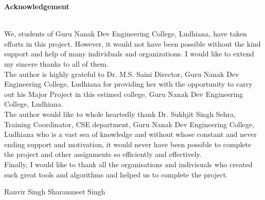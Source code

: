 \begin{center}
{\Huge \noindent \bf{Acknowledgement}\vskip 0.2in}
\end{center}
 \hrulefill \\

We, students of Guru Nanak Dev Engineering College, Ludhiana, have taken efforts in this project.
However, it would not have been possible without the kind support and help of many individuals
and organizations. I would like to extend my sincere thanks to all of them.\\

The author is highly grateful to Dr. M.S. Saini Director, Guru Nanak Dev Engineering College, Ludhiana for providing her with the opportunity to carry out his Major Project in this estimed college, Guru Nanak Dev Engineering College, Ludhiana.\\

The author would like to whole heartedly thank Dr. Sukhjit Singh Sehra, Training Coordinator, CSE department, Guru Nanak Dev Engineering College, Ludhiana who is a vast sea of knowledge and without whose constant and never ending support and motivation, it would never have been possible to complete the project and other assignments so efficiently and effectively.\\

Finally, I would like to thank all the organisations and indivisuals who created such great tools and algorithms and helped us to complete the project. 

\vskip 1.0cm 
\noindent Ranvir Singh
\vskip 1.0cm 
\noindent Sharanmeet Singh




